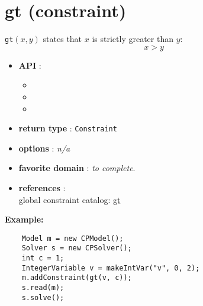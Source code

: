 \label{gt}
\hypertarget{gt}{}

\section{gt (constraint)}\label{gt:gtconstraint}\hypertarget{gt:gtconstraint}{}
\begin{notedef}
  \texttt{gt}$(x,y)$ states that $x$ is strictly greater than $y$:
$$x>y$$
\end{notedef}

\begin{itemize}
	\item \textbf{API} :
	\begin{itemize}
		\item {}
		\item {}
		\item {}
	\end{itemize}
	\item \textbf{return type} : \texttt{Constraint}
	\item \textbf{options} : \emph{n/a}
	\item \textbf{favorite domain} : \emph{to complete}.
	\item \textbf{references} :\\
      global constraint catalog: \href{http://www.emn.fr/x-info/sdemasse/gccat/Cgt.html}{gt}
\end{itemize}

\textbf{Example:}
\begin{lstlisting}
	Model m = new CPModel();
	Solver s = new CPSolver();
	int c = 1;
	IntegerVariable v = makeIntVar("v", 0, 2);
	m.addConstraint(gt(v, c));
	s.read(m);
	s.solve();
\end{lstlisting}
